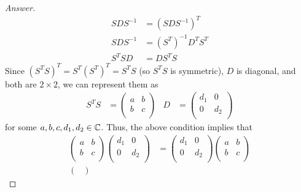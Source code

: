 \documentclass[../psets.tex]{subfiles}
\begin{document}
\begin{enumerate}[label={\textbf{2.\arabic*.}}]
\begin{enumerate}
\begin{proof}[Answer]
            \begin{align*}
                SDS^{-1} &= (SDS^{-1})^T\\
                SDS^{-1} &= (S^T)^{-1}D^TS^T\\
                S^TSD &= DS^TS
            \end{align*}
            Since $(S^TS)^T=S^T(S^T)^T=S^TS$ (so $S^TS$ is symmetric), $D$ is diagonal, and both are $2\times 2$, we can represent them as
            \begin{align*}
                S^TS &=
                \begin{pmatrix}
                    a & b\\
                    b & c\\
                \end{pmatrix}&
                D &=
                \begin{pmatrix}
                    d_1 & 0\\
                    0 & d_2\\
                \end{pmatrix}
            \end{align*}
            for some $a,b,c,d_1,d_2\in\mathbb{C}$. Thus, the above condition implies that
            \begin{align*}
                \begin{pmatrix}
                    a & b\\
                    b & c\\
                \end{pmatrix}
                \begin{pmatrix}
                    d_1 & 0\\
                    0 & d_2\\
                \end{pmatrix}
                &=
                \begin{pmatrix}
                    d_1 & 0\\
                    0 & d_2\\
                \end{pmatrix}
                \begin{pmatrix}
                    a & b\\
                    b & c\\
                \end{pmatrix}\\
                \begin{pmatrix}

\end{pmatrix}
\end{align*}
\end{proof}
\end{enumerate}
\end{enumerate}
\end{document}
